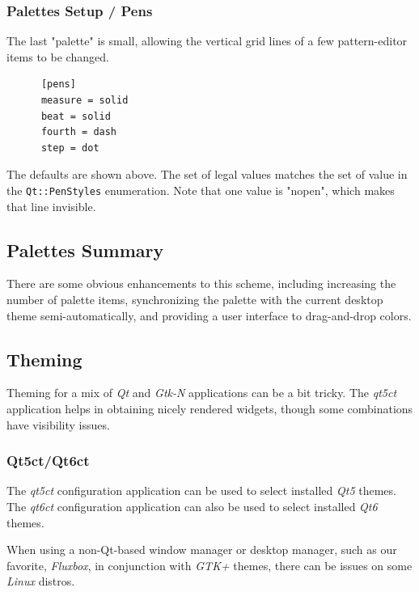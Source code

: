 \subsubsection{Palettes Setup / Pens}
\label{subsubsec:palettes_setup_pens}

   The last "palette" is small, allowing the vertical grid lines
   of a few pattern-editor
   items to be changed.

   \begin{verbatim}
      [pens]
      measure = solid
      beat = solid
      fourth = dash
      step = dot
   \end{verbatim}

   The defaults are shown above.
   The set of legal values matches the set
   of value in the \texttt{Qt::PenStyles} enumeration.
   Note that one value is "nopen", which makes that line invisible.

\subsection{Palettes Summary}
\label{subsec:palettes_summary}

   There are some obvious enhancements to this scheme, including increasing the
   number of palette items, synchronizing the palette with the current desktop
   theme semi-automatically, and providing a user interface to drag-and-drop
   colors.

\subsection{Theming}
\label{subsec:palettes_theming}

   Theming for a mix of \textsl{Qt} and \textsl{Gtk-N} applications can be a
   bit tricky.
   The \textsl{qt5ct} application helps in obtaining nicely rendered
   widgets, though some combinations have visibility issues.

\subsubsection{Qt5ct/Qt6ct}
\label{subsubsec:palettes_theming_qt5ct}

   The \textsl{qt5ct} configuration application can be used to select installed
   \textsl{Qt5} themes.
   The \textsl{qt6ct} configuration application can also
   be used to select installed
   \textsl{Qt6} themes.

   When using a non-Qt-based window manager or desktop manager, such as our
   favorite, \textsl{Fluxbox}, in conjunction with \textsl{GTK+} themes,
   there can be issues on some \textsl{Linux} distros.

